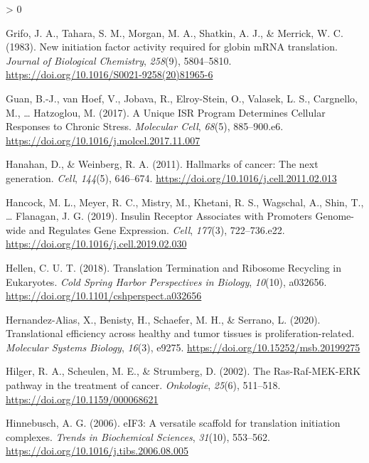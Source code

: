 \documentclass[
  12pt,
  openany]{book}
\newlength{\cslhangindent}
\newenvironment{CSLReferences}[2] %
 {%
  \setlength{\parindent}{0pt}
  \ifodd #1 \everypar{\setlength{\hangindent}{\cslhangindent}}\ignorespaces\fi
  \ifnum #2 > 0
  \setlength{\parskip}{#2\baselineskip}
  \fi
 }%
 {}
\begin{document}
\begin{CSLReferences}{1}{0}
\leavevmode\hypertarget{ref-Grifo1983}{}%
Grifo, J. A., Tahara, S. M., Morgan, M. A., Shatkin, A. J., \& Merrick, W. C. (1983). New initiation factor activity required for globin {mRNA} translation. \emph{Journal of Biological Chemistry}, \emph{258}(9), 5804--5810. \url{https://doi.org/10.1016/S0021-9258(20)81965-6}

\leavevmode\hypertarget{ref-Guan2017}{}%
Guan, B.-J., van Hoef, V., Jobava, R., Elroy-Stein, O., Valasek, L. S., Cargnello, M., \ldots{} Hatzoglou, M. (2017). A {Unique ISR Program Determines Cellular Responses} to {Chronic Stress}. \emph{Molecular Cell}, \emph{68}(5), 885--900.e6. \url{https://doi.org/10.1016/j.molcel.2017.11.007}

\leavevmode\hypertarget{ref-Hanahan2011}{}%
Hanahan, D., \& Weinberg, R. A. (2011). Hallmarks of cancer: {The} next generation. \emph{Cell}, \emph{144}(5), 646--674. \url{https://doi.org/10.1016/j.cell.2011.02.013}

\leavevmode\hypertarget{ref-Hancock2019}{}%
Hancock, M. L., Meyer, R. C., Mistry, M., Khetani, R. S., Wagschal, A., Shin, T., \ldots{} Flanagan, J. G. (2019). Insulin {Receptor Associates} with {Promoters Genome}-wide and {Regulates Gene Expression}. \emph{Cell}, \emph{177}(3), 722--736.e22. \url{https://doi.org/10.1016/j.cell.2019.02.030}

\leavevmode\hypertarget{ref-Hellen2018}{}%
Hellen, C. U. T. (2018). Translation {Termination} and {Ribosome Recycling} in {Eukaryotes}. \emph{Cold Spring Harbor Perspectives in Biology}, \emph{10}(10), a032656. \url{https://doi.org/10.1101/cshperspect.a032656}

\leavevmode\hypertarget{ref-Hernandez-Alias2020}{}%
Hernandez-Alias, X., Benisty, H., Schaefer, M. H., \& Serrano, L. (2020). Translational efficiency across healthy and tumor tissues is proliferation-related. \emph{Molecular Systems Biology}, \emph{16}(3), e9275. \url{https://doi.org/10.15252/msb.20199275}

\leavevmode\hypertarget{ref-Hilger2002}{}%
Hilger, R. A., Scheulen, M. E., \& Strumberg, D. (2002). The {Ras}-{Raf}-{MEK}-{ERK} pathway in the treatment of cancer. \emph{Onkologie}, \emph{25}(6), 511--518. \url{https://doi.org/10.1159/000068621}

\leavevmode\hypertarget{ref-Hinnebusch2006}{}%
Hinnebusch, A. G. (2006). {eIF3}: A versatile scaffold for translation initiation complexes. \emph{Trends in Biochemical Sciences}, \emph{31}(10), 553--562. \url{https://doi.org/10.1016/j.tibs.2006.08.005}


\end{CSLReferences}
\end{document}
